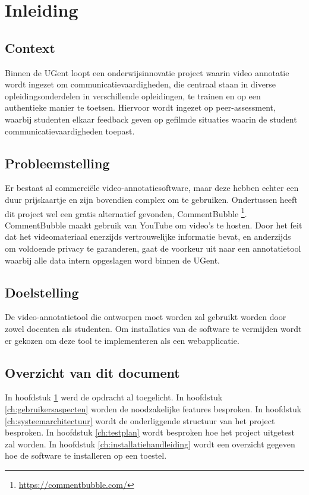 \chapter{Inleiding}
\label{ch:inleiding}
\section{Context}
Binnen de UGent loopt een onderwijsinnovatie project waarin video annotatie wordt ingezet om communicatievaardigheden, die centraal staan in diverse opleidingsonderdelen in verschillende opleidingen, te trainen en op een authentieke manier te toetsen. Hiervoor wordt ingezet op peer-assessment, waarbij studenten elkaar feedback geven op gefilmde situaties waarin de student communicatievaardigheden toepast.
\section{Probleemstelling}
Er bestaat al commerci\"{e}le video-annotatiesoftware, maar deze hebben echter een duur prijskaartje en zijn bovendien complex om te gebruiken. Ondertussen heeft dit project wel een gratis alternatief gevonden, CommentBubble \footnote{\url{https://commentbubble.com/}}. CommentBubble maakt gebruik van YouTube om video's te hosten. Door het feit dat het videomateriaal enerzijds vertrouwelijke informatie bevat, en anderzijds om voldoende privacy te garanderen, gaat de voorkeur uit naar een annotatietool waarbij alle data intern opgeslagen word binnen de UGent.
\section{Doelstelling}
De video-annotatietool die ontworpen moet worden zal gebruikt worden door zowel docenten als studenten. Om installaties van de software te vermijden wordt er gekozen om deze tool te implementeren als een webapplicatie. 
\section{Overzicht van dit document}
In hoofdstuk \ref{ch:inleiding} werd de opdracht al toegelicht. In hoofdstuk \ref{ch:gebruikersaspecten} worden de noodzakelijke features besproken. In hoofdstuk \ref{ch:systeemarchitectuur} wordt de onderliggende structuur van het project besproken. In hoofdstuk \ref{ch:testplan} wordt besproken hoe het project uitgetest zal worden. In hoofdstuk \ref{ch:installatiehandleiding} wordt een overzicht gegeven hoe de software te installeren op een toestel.

